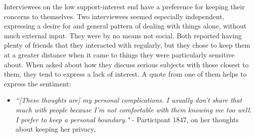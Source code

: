   Interviewees on the low support-interest end
  have a preference for keeping their concerns to themselves.
  Two interviewees seemed especially independent,
  expressing a desire for and general pattern of dealing with things alone,
  without much external input.
  They were by no means not social.
  Both reported having plenty of friends that they interacted with regularly,
  but they chose to keep them at a greater distance when it came to things
  they were particularly sensitive about.
  When asked
  about how they discuss serious subjects with those closest to them,
  they tend to express a lack of interest.
  A quote from one of them
  helps to express the sentiment:
  \begin{itemize}
  \item
  \textit{
  ``[These thoughts are] my personal complications.
  I usually don't share that much with people because
  I'm not comfortable with them knowing me too well.
  I prefer to keep a personal boundary."
  }
  - Participant 1847, on her thoughts about keeping her privacy,
  \end{itemize}

